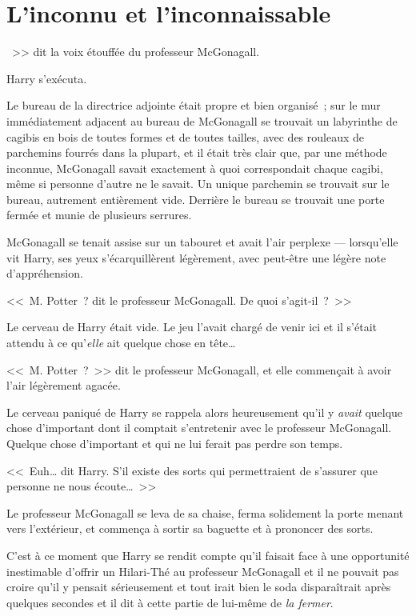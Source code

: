 \chapter{L'inconnu et l'inconnaissable}

~>> dit la voix étouffée du professeur McGonagall.

\hplettrineextrapara
Harry s'exécuta.

Le bureau de la directrice adjointe était propre et bien organisé~; sur le mur immédiatement adjacent au bureau de McGonagall se trouvait un labyrinthe de cagibis en bois de toutes formes et de toutes tailles, avec des rouleaux de parchemins fourrés dans la plupart, et il était très clair que, par une méthode inconnue, McGonagall savait exactement à quoi correspondait chaque cagibi, même si personne d'autre ne le savait. Un unique parchemin se trouvait sur le bureau, autrement entièrement vide. Derrière le bureau se trouvait une porte fermée et munie de plusieurs serrures.

McGonagall se tenait assise sur un tabouret et avait l'air perplexe — lorsqu'elle vit Harry, ses yeux s'écarquillèrent légèrement, avec peut-être une légère note d'appréhension.

<<~M. Potter~? dit le professeur McGonagall. De quoi s'agit-il~?~>>

Le cerveau de Harry était vide. Le jeu l'avait chargé de venir ici et il s'était attendu à ce qu'\emph{elle} ait quelque chose en tête…

<<~M. Potter~?~>> dit le professeur McGonagall, et elle commençait à avoir l'air légèrement agacée.

Le cerveau paniqué de Harry se rappela alors heureusement qu'il y \emph{avait} quelque chose d'important dont il comptait s'entretenir avec le professeur McGonagall. Quelque chose d'important et qui ne lui ferait pas perdre son temps.

<<~Euh… dit Harry. S'il existe des sorts qui permettraient de s'assurer que personne ne nous écoute…~>>

Le professeur McGonagall se leva de sa chaise, ferma solidement la porte menant vers l'extérieur, et commença à sortir sa baguette et à prononcer des sorts.

C'est à ce moment que Harry se rendit compte qu'il faisait face à une opportunité inestimable d'offrir un Hilari-Thé au professeur McGonagall et il ne pouvait pas croire qu'il y pensait sérieusement et tout irait bien le soda disparaîtrait après quelques secondes et il dit à cette partie de lui-même de \emph{la fermer}.


